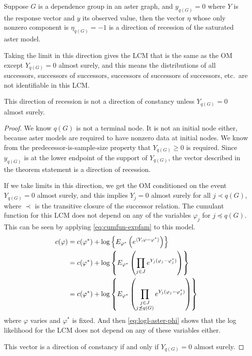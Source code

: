 \begin{theorem} \label{th:dor-predecessor-zero}
Suppose $G$ is a dependence group in an aster graph, and $y_{q(G)} = 0$
where $Y$ is the response vector and $y$ its observed value, then the
vector $\eta$ whose only nonzero component is $\eta_{q(G)} = -1$ is a
direction of recession of the saturated aster model.

Taking the limit in this direction gives the LCM that is the same as the
OM except $Y_{q(G)} = 0$ almost surely, and this means the distributions
of all successors, successors of successors, successors of successors of
successors, etc.\ are not identifiable in this LCM.

This direction of recession is not a direction of constancy
unless $Y_{q(G)} = 0$ almost surely.
\end{theorem}
\begin{proof}
We know $q(G)$ is not a terminal node.  It is not an initial node either,
because aster models are required to have nonzero data at initial nodes.
We know from
the predecessor-is-sample-size property that $Y_{q(G)} \ge 0$ is required.
Since $y_{q(G)}$ is at the lower endpoint of the support of $Y_{q(G)}$,
the vector described in the theorem statement is a direction of recession.

If we take limits in this direction, we get the OM conditioned on the event
$Y_{q(G)} = 0$ almost surely, and this implies $Y_j = 0$ almost surely for
all $j \prec q(G)$, where $\prec$ is the transitive closure of the successor
relation.  The cumulant function for this LCM does not depend on any
of the variables $\varphi_j$ for $j \preceq q(G)$.
This can be seen by applying \eqref{eq:cumfun-expfam} to this model.
\begin{align*}
   c(\varphi)
   & =
   c(\varphi^*) + \log\left\{ E_{\varphi^*} \left(
   e^{\langle Y, \varphi - \varphi^* \rangle} \right) \right\}
   \\
   & =
   c(\varphi^*) + \log\left\{ E_{\varphi^*} \left(
   \prod_{j \in J} e^{Y_j (\varphi_j - \varphi^*_j)}
   \right) \right\}
   \\
   & =
   c(\varphi^*) + \log\left\{ E_{\varphi^*} \left(
   \prod_{\substack{j \in J \\ j \not\preceq q(G)}}
   e^{Y_j (\varphi_j - \varphi^*_j)}
   \right) \right\}
\end{align*}
where $\varphi$ varies and $\varphi^*$ is fixed.
And then \eqref{eq:logl-aster-phi} shows that the log likelihood for the
LCM does not depend on any of these variables either.

This vector is a direction of constancy if and only if $Y_{q(G)} = 0$ almost
surely.
\end{proof}

